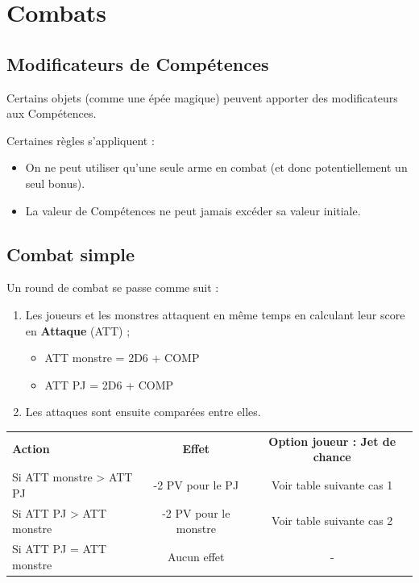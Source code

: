 \documentclass[a4paper, 11pt, twoside]{article}
\begin{document}
\section{Combats}
\label{sec:org15a2fbe}

\subsection{Modificateurs de Compétences}
\label{sec:orgfaff590}

Certains objets (comme une épée magique) peuvent apporter des modificateurs aux Compétences.

Certaines règles s'appliquent :
\begin{itemize}
\item On ne peut utiliser qu'une seule arme en combat (et donc potentiellement un seul bonus).
\item La valeur de Compétences ne peut jamais excéder sa valeur initiale.
\end{itemize}

\subsection{Combat simple}
\label{sec:org5dcd74a}

Un round de combat se passe comme suit :
\begin{enumerate}
\item Les joueurs et les monstres attaquent en même temps en calculant leur score en \textbf{Attaque} (ATT) ;
\begin{itemize}
\item ATT monstre = 2D6 + COMP
\item ATT PJ = 2D6 + COMP
\end{itemize}
\item Les attaques sont ensuite comparées entre elles.
\end{enumerate}

\begin{longtable}{lcc}
\textbf{Action} & \textbf{Effet} & \textbf{Option joueur : Jet de chance}\\
Si ATT monstre > ATT PJ & -2 PV pour le PJ & Voir table suivante cas 1\\
Si ATT PJ > ATT monstre & -2 PV pour le monstre & Voir table suivante cas 2\\
Si ATT PJ = ATT monstre & Aucun effet & -\\
\end{longtable}
\end{document}

